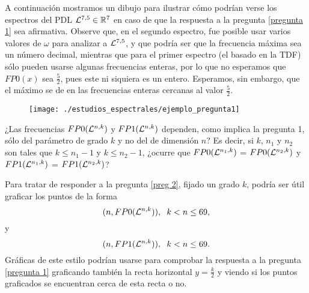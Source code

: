 A continuación mostramos un dibujo para
ilustrar cómo podrían verse los
espectros del PDL
$\mathcal{L}^{7,5} \in \mathbb{R}^{7}$
en caso de que la respuesta a la pregunta
\ref{pregunta 1} sea afirmativa.
Observe que, en el segundo espectro,
fue posible usar varios valores de $\omega$ para analizar
a $\mathcal{L}^{7,5}$, y que podría ser que la frecuencia máxima
sea un número decimal, mientras que para el primer espectro
(el basado en la TDF) sólo pueden usarse algunas frecuencias
enteras, por lo que no esperamos que 
$FP0(x)$
sea $\frac{5}{2}$, pues este ni siquiera es un entero.
Esperamos, sin embargo, que el máximo se de en las frecuencias
enteras cercanas al valor $\frac{5}{2}$.

\begin{figure}[H]
	\centering
	\texttt{[image: ./estudios\_espectrales/ejemplo\_pregunta1]} 
\end{figure}	

\begin{pregunta}
\label{preg 2}
¿Las frecuencias 
$FP0(\mathcal{L}^{n,k})$ y $FP1(\mathcal{L}^{n,k})$
dependen, como implica la pregunta 1, sólo del parámetro
de grado $k$ y no del de dimensión $n$?
Es decir, si $k$, $n_{1}$ y $n_{2}$
son tales que $k \leq n_{1}-1$ y
$k \leq n_{2}-1$, ¿ocurre que 
$FP0(\mathcal{L}^{n_{1},k})$ = $FP0(\mathcal{L}^{n_{2},k})$
y 
$FP1(\mathcal{L}^{n_{1},k})$ = $FP1(\mathcal{L}^{n_{2},k})$?
\end{pregunta}

Para tratar de responder a la pregunta \ref{preg 2},
fijado un grado $k$,
podría ser útil graficar los puntos de la forma
\begin{equation}
\label{eq0: 8may}
(n, FP0(\mathcal{L}^{n,k})), \hspace{0.2cm} k < n \leq 69,
\end{equation}
y 
\begin{equation}
\label{eq1: 8may}
(n, FP1(\mathcal{L}^{n,k})), \hspace{0.2cm} k < n \leq 69.
\end{equation}
Gráficas de este estilo podrían usarse para comprobar
la respuesta a la pregunta \ref{pregunta 1} 
graficando también la recta horizontal $y = \frac{k}{2}$
y viendo si los puntos graficados se encuentran cerca
de esta recta o no. 

